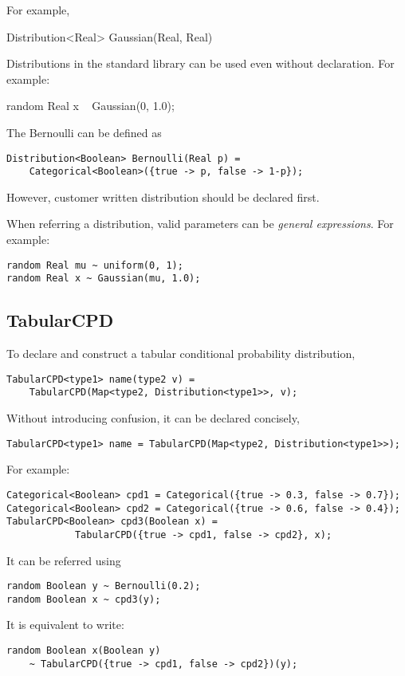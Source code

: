 \documentclass[12pt]{article}
\begin{document}
For example,
\begin{blog}
Distribution<Real> Gaussian(Real, Real)
\end{blog}

Distributions in the standard library can be used even without declaration. For example:
\begin{blog}
random Real x ~ Gaussian(0, 1.0);
\end{blog}

The Bernoulli can be defined as 
\begin{verbatim}
Distribution<Boolean> Bernoulli(Real p) = 
    Categorical<Boolean>({true -> p, false -> 1-p});
\end{verbatim}


However, customer written distribution should be declared first. 

When referring a distribution, valid parameters can be \emph{general expressions}.
For example:
\begin{verbatim}
random Real mu ~ uniform(0, 1);
random Real x ~ Gaussian(mu, 1.0);
\end{verbatim}


\subsection{TabularCPD}
To declare and construct a tabular conditional probability distribution, 
\begin{verbatim}
TabularCPD<type1> name(type2 v) = 
    TabularCPD(Map<type2, Distribution<type1>>, v);
\end{verbatim}
Without introducing confusion, it can be declared concisely,
\begin{verbatim}
TabularCPD<type1> name = TabularCPD(Map<type2, Distribution<type1>>);
\end{verbatim}

For example:
\begin{verbatim}
Categorical<Boolean> cpd1 = Categorical({true -> 0.3, false -> 0.7});
Categorical<Boolean> cpd2 = Categorical({true -> 0.6, false -> 0.4});
TabularCPD<Boolean> cpd3(Boolean x) = 
            TabularCPD({true -> cpd1, false -> cpd2}, x);
\end{verbatim}
It can be referred using 
\begin{verbatim}
random Boolean y ~ Bernoulli(0.2);
random Boolean x ~ cpd3(y);
\end{verbatim}
It is equivalent to write:
\begin{verbatim}
random Boolean x(Boolean y) 
    ~ TabularCPD({true -> cpd1, false -> cpd2})(y);
\end{verbatim}
\end{document}
